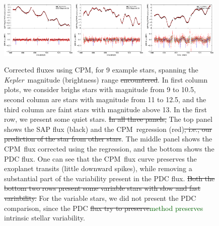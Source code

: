 \documentclass[12pt, preprint]{aastex}
\newcommand{\project}[1]{\textsl{#1}}
\newcommand{\Kepler}{\project{Kepler}}
\newcommand{\name}{CPM}
\newcommand{\revise}[1]{\textcolor{darkgreen}{#1}}
\newcommand{\remove}[1]{\sout{#1}}
\begin{document}
\begin{figure}[p]
\begin{center}
\includegraphics[width=0.32\textwidth]{f5g}
\hfill
\includegraphics[width=0.32\textwidth]{f5h}
\hfill
\includegraphics[width=0.32\textwidth]{f5i}
\end{center}

\caption{
  \label{fluxes} 
  Corrected fluxes using \name, for 9 example stars, spanning the \Kepler\ magnitude (brightness) range \remove{encountered}. 
  In first column plots, we consider brighs stars with magnitude from 9 to 10.5, second column are stars with magnitude from 11 to 12.5, and the third column are faint stars with magnitude above 13. 
  In the first row, we present some quiet stars. 
  \remove{In all three panels,} The top panel shows the SAP flux (black) and the \name\ regression (red)\remove{, i.e., our prediction of the star from other stars}. 
  The middle panel shows the \name\ flux corrected using the regression, and the bottom shows the PDC flux. 
  One can see that the \name\ flux curve preserves the exoplanet transits (little downward spikes), 
    while removing a substantial part of the variability present in the PDC flux. 
  \remove{Both the bottom two rows present some variable stars with slow and fast variability.} 
  For the variable stars, we did not present the PDC comparison, 
    since the PDC \remove{flux try to preserve}\revise{method preserves} intrinsic stellar variability.}
\end{figure}
\end{document}
